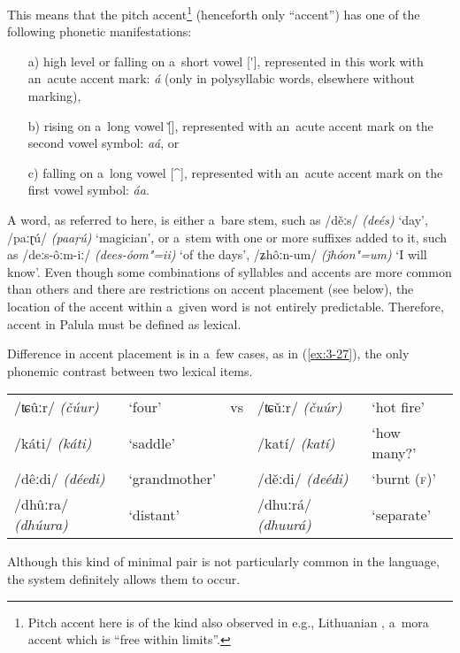 This means that the pitch accent\footnote{Pitch accent here is of the kind also observed in e.g., Lithuanian \citep[73--82]{szemerenyi1996}, a~mora accent which is ``free within limits''.} (henceforth only ``accent'') has one of the following phonetic manifestations:
\begin{enumerate}
\item[a)] high level or falling on a~short vowel [\'{}], represented in this work with an~acute accent mark: \textit{á} (only in polysyllabic words, elsewhere without marking), 
\item[b)] rising on a~long vowel [\v{}], represented with an~acute accent mark on the second vowel symbol: \textit{aá}, or 
\item[c)] falling on a~long vowel [\^{}], represented with an~acute accent mark on the first vowel symbol: \textit{áa}.
\end{enumerate}
A word, as referred to here, is either a~bare stem, such as /děːs/ \textit{(deés)} `day', /paːɽú/ \textit{(paaṛú)} `magician', or a~stem with one or more suffixes added to it, such as /deːs-ôːm-iː/ \textit{(dees-óom"=ii)} `of the days', /ʑhôːn-um/ \textit{(ǰhóon"=um)} `I will know'. Even though some combinations of syllables and accents are more common than others and there are restrictions on accent placement (see below), the location of the accent within a~given word is not entirely predictable. Therefore, accent in Palula must be defined as lexical. 


Difference in accent placement is in a~few cases, as in (\ref{ex:3-27}), the only phonemic contrast between two lexical items.


\begin{exe}
\extab
\label{ex:3-27}
\begin{tabularx}{116mm}{ l l l l l }
/ʨûːr/ \textit{(čúur)} &
`four' &
vs &
/ʨǔːr/ \textit{(čuúr)} &
`hot fire'\\
/káti/ \textit{(káti)} &
`saddle' &
&
/katí/ \textit{(katí)} &
`how many?'\\
/dêːdi/ \textit{(déedi)} &
`grandmother' &
&
/děːdi/ \textit{(deédi)} &
`burnt (\textsc{f})'\\
/dhûːra/ \textit{(dhúura)} &
`distant' &
&
/dhuːrá/ \textit{(dhuurá)} &
`separate'\\
\end{tabularx}
\end{exe}

Although this kind of minimal pair is not particularly common in the language, the system definitely allows them to occur.

